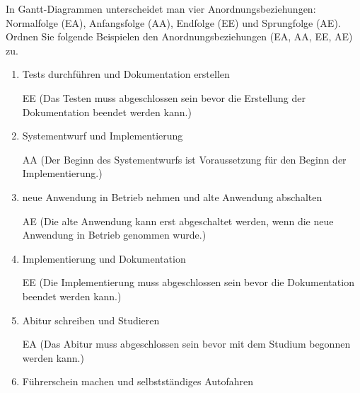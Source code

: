 \documentclass{lehramt-informatik-haupt}
\begin{document}
In Gantt-Diagrammen unterscheidet man vier Anordnungsbeziehungen:
Normalfolge (EA), Anfangsfolge (AA), Endfolge (EE) und Sprungfolge
(AE). Ordnen Sie folgende Beispielen den Anordnungsbeziehungen (EA, AA,
EE, AE) zu.

\begin{enumerate}


\item Tests durchführen und Dokumentation erstellen

\begin{antwort}
EE (Das Testen muss abgeschlossen sein bevor die Erstellung der
Dokumentation beendet werden kann.)
\end{antwort}


\item Systementwurf und Implementierung

\begin{antwort}
AA (Der Beginn des Systementwurfs ist Voraussetzung für den Beginn der
Implementierung.)
\end{antwort}


\item neue Anwendung in Betrieb nehmen und alte Anwendung abschalten

\begin{antwort}
AE (Die alte Anwendung kann erst abgeschaltet werden, wenn die neue
Anwendung in Betrieb genommen wurde.)
\end{antwort}


\item Implementierung und Dokumentation

\begin{antwort}
EE (Die Implementierung muss abgeschlossen sein bevor die Dokumentation
beendet werden kann.)
\end{antwort}


\item Abitur schreiben und Studieren

\begin{antwort}
EA (Das Abitur muss abgeschlossen sein bevor mit dem Studium begonnen
werden kann.)
\end{antwort}


\item Führerschein machen und selbstständiges Autofahren


\end{enumerate}
\end{document}
